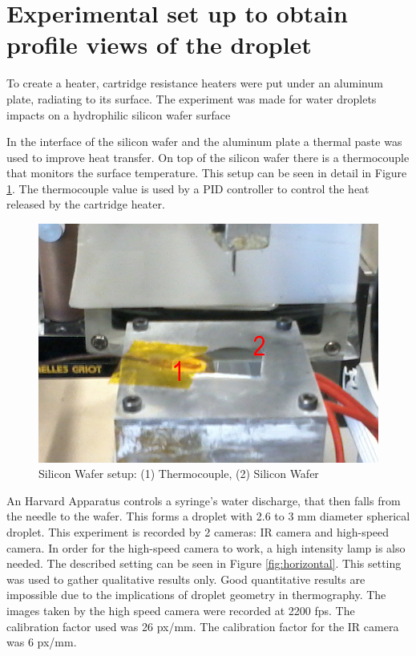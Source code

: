 
\section{Experimental set up to obtain profile views of the droplet}

\par To create a heater, cartridge resistance heaters were put under an aluminum plate, radiating to its surface. The experiment was made for water droplets impacts on a hydrophilic silicon wafer surface \\

\par In the interface of the silicon wafer and the aluminum plate a thermal paste was used to improve heat transfer. On top of the silicon wafer there is a thermocouple that monitors the surface temperature. This setup can be seen in detail in Figure \ref{fig:horizontal2}. The thermocouple value is used by a PID controller to control the heat released by the cartridge heater.\\

\begin{figure}[h]
\centering
\includegraphics[width=0.5\linewidth]{Figures/3.Chapter/horizontal2.png}
\caption{Silicon Wafer setup: (1) Thermocouple, (2) Silicon Wafer}
\label{fig:horizontal2}
\end{figure}

\par An Harvard Apparatus controls a syringe's water discharge, that then falls from the needle to the wafer. This forms a droplet with 2.6 to 3 mm diameter spherical droplet. This experiment is recorded by 2 cameras: IR camera and high-speed camera. In order for the high-speed camera to work, a high intensity lamp is also needed. The described setting can be seen in Figure \ref{fig:horizontal}. This setting was used to gather qualitative results only. Good quantitative results are impossible due to the implications of droplet geometry in thermography. The images taken by the high speed camera were recorded at 2200 fps. The calibration factor used was 26 px/mm. The calibration factor for the IR camera was 6 px/mm.

